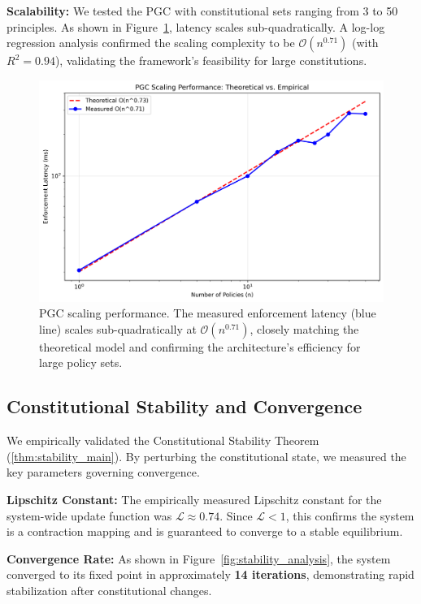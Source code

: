 \documentclass[10pt,twocolumn]{article}
\newcommand{\lipschitz}{\mathcal{L}}
\newcommand{\bigO}{\mathcal{O}}
\theoremstyle{definition}
\begin{document}
\textbf{Scalability:} We tested the PGC with constitutional sets ranging from 3 to 50 principles. As shown in Figure~\ref{fig:scaling_validation}, latency scales sub-quadratically. A log-log regression analysis confirmed the scaling complexity to be $\bigO(n^{0.71})$ (with $R^2 = 0.94$), validating the framework's feasibility for large constitutions.

\begin{figure}[H]
    \centering
    \includegraphics[width=\linewidth]{scaling_validation.png}
    \caption{PGC scaling performance. The measured enforcement latency (blue line) scales sub-quadratically at $\bigO(n^{0.71})$, closely matching the theoretical model and confirming the architecture's efficiency for large policy sets.}
    \label{fig:scaling_validation}
\end{figure}

\subsection{Constitutional Stability and Convergence}
We empirically validated the Constitutional Stability Theorem (\ref{thm:stability_main}). By perturbing the constitutional state, we measured the key parameters governing convergence.

\textbf{Lipschitz Constant:} The empirically measured Lipschitz constant for the system-wide update function was $\lipschitz \approx 0.74$. Since $\lipschitz < 1$, this confirms the system is a contraction mapping and is guaranteed to converge to a stable equilibrium.

\textbf{Convergence Rate:} As shown in Figure~\ref{fig:stability_analysis}, the system converged to its fixed point in approximately \textbf{14 iterations}, demonstrating rapid stabilization after constitutional changes.
\end{document}
